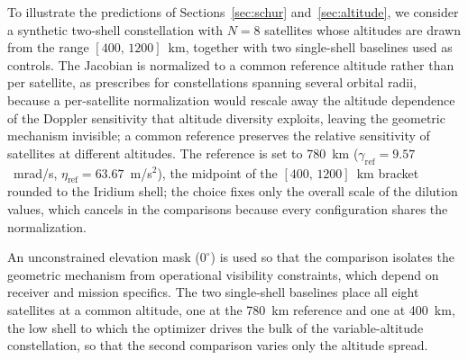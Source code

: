 \documentclass[letterpaper,times]{IONconf-v2}
\theoremstyle{plain}
\theoremstyle{remark}
\begin{document}
To illustrate the predictions of Sections~\ref{sec:schur} and~\ref{sec:altitude}, we consider a synthetic two-shell constellation with $N = 8$ satellites whose altitudes are drawn from the range $[400,\,1200]$~km, together with two single-shell baselines used as controls. The Jacobian is normalized to a common reference altitude rather than per satellite, as \textcite{Psiaki2021} prescribes for constellations spanning several orbital radii, because a per-satellite normalization would rescale away the altitude dependence of the Doppler sensitivity that altitude diversity exploits, leaving the geometric mechanism invisible; a common reference preserves the relative sensitivity of satellites at different altitudes. The reference is set to 780~km ($\gamma_{\mathrm{ref}} = 9.57$~mrad/s, $\eta_{\mathrm{ref}} = 63.67$~m/s$^2$), the midpoint of the $[400,\,1200]$~km bracket rounded to the Iridium shell; the choice fixes only the overall scale of the dilution values, which cancels in the comparisons because every configuration shares the normalization.

An unconstrained elevation mask ($0^\circ$) is used so that the comparison isolates the geometric mechanism from operational visibility constraints, which depend on receiver and mission specifics. The two single-shell baselines place all eight satellites at a common altitude, one at the 780~km reference and one at 400~km, the low shell to which the optimizer drives the bulk of the variable-altitude constellation, so that the second comparison varies only the altitude spread.
\end{document}
